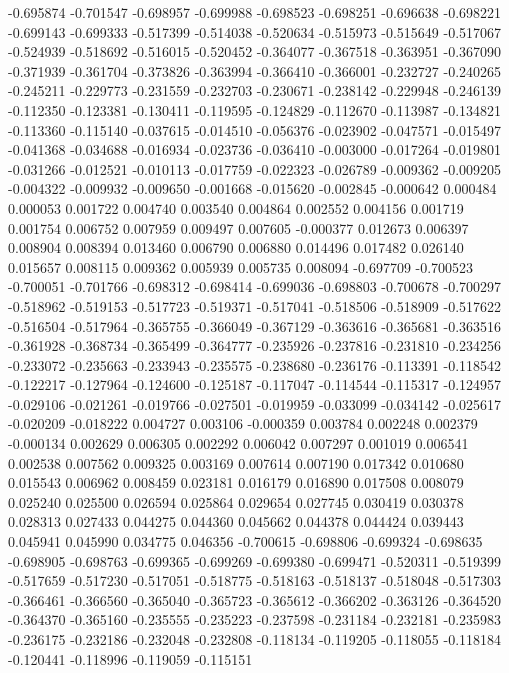 -0.695874
-0.701547
-0.698957
-0.699988
-0.698523
-0.698251
-0.696638
-0.698221
-0.699143
-0.699333
-0.517399
-0.514038
-0.520634
-0.515973
-0.515649
-0.517067
-0.524939
-0.518692
-0.516015
-0.520452
-0.364077
-0.367518
-0.363951
-0.367090
-0.371939
-0.361704
-0.373826
-0.363994
-0.366410
-0.366001
-0.232727
-0.240265
-0.245211
-0.229773
-0.231559
-0.232703
-0.230671
-0.238142
-0.229948
-0.246139
-0.112350
-0.123381
-0.130411
-0.119595
-0.124829
-0.112670
-0.113987
-0.134821
-0.113360
-0.115140
-0.037615
-0.014510
-0.056376
-0.023902
-0.047571
-0.015497
-0.041368
-0.034688
-0.016934
-0.023736
-0.036410
-0.003000
-0.017264
-0.019801
-0.031266
-0.012521
-0.010113
-0.017759
-0.022323
-0.026789
-0.009362
-0.009205
-0.004322
-0.009932
-0.009650
-0.001668
-0.015620
-0.002845
-0.000642
0.000484
0.000053
0.001722
0.004740
0.003540
0.004864
0.002552
0.004156
0.001719
0.001754
0.006752
0.007959
0.009497
0.007605
-0.000377
0.012673
0.006397
0.008904
0.008394
0.013460
0.006790
0.006880
0.014496
0.017482
0.026140
0.015657
0.008115
0.009362
0.005939
0.005735
0.008094
-0.697709
-0.700523
-0.700051
-0.701766
-0.698312
-0.698414
-0.699036
-0.698803
-0.700678
-0.700297
-0.518962
-0.519153
-0.517723
-0.519371
-0.517041
-0.518506
-0.518909
-0.517622
-0.516504
-0.517964
-0.365755
-0.366049
-0.367129
-0.363616
-0.365681
-0.363516
-0.361928
-0.368734
-0.365499
-0.364777
-0.235926
-0.237816
-0.231810
-0.234256
-0.233072
-0.235663
-0.233943
-0.235575
-0.238680
-0.236176
-0.113391
-0.118542
-0.122217
-0.127964
-0.124600
-0.125187
-0.117047
-0.114544
-0.115317
-0.124957
-0.029106
-0.021261
-0.019766
-0.027501
-0.019959
-0.033099
-0.034142
-0.025617
-0.020209
-0.018222
0.004727
0.003106
-0.000359
0.003784
0.002248
0.002379
-0.000134
0.002629
0.006305
0.002292
0.006042
0.007297
0.001019
0.006541
0.002538
0.007562
0.009325
0.003169
0.007614
0.007190
0.017342
0.010680
0.015543
0.006962
0.008459
0.023181
0.016179
0.016890
0.017508
0.008079
0.025240
0.025500
0.026594
0.025864
0.029654
0.027745
0.030419
0.030378
0.028313
0.027433
0.044275
0.044360
0.045662
0.044378
0.044424
0.039443
0.045941
0.045990
0.034775
0.046356
-0.700615
-0.698806
-0.699324
-0.698635
-0.698905
-0.698763
-0.699365
-0.699269
-0.699380
-0.699471
-0.520311
-0.519399
-0.517659
-0.517230
-0.517051
-0.518775
-0.518163
-0.518137
-0.518048
-0.517303
-0.366461
-0.366560
-0.365040
-0.365723
-0.365612
-0.366202
-0.363126
-0.364520
-0.364370
-0.365160
-0.235555
-0.235223
-0.237598
-0.231184
-0.232181
-0.235983
-0.236175
-0.232186
-0.232048
-0.232808
-0.118134
-0.119205
-0.118055
-0.118184
-0.120441
-0.118996
-0.119059
-0.115151
